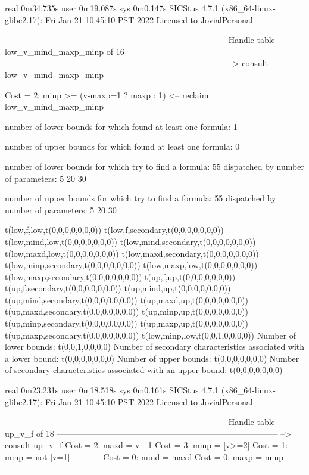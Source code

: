 real	0m34.735s
user	0m19.087s
sys	0m0.147s
SICStus 4.7.1 (x86_64-linux-glibc2.17): Fri Jan 21 10:45:10 PST 2022
Licensed to JovialPersonal


--------------------------------------------------------------------------------
Handle table low_v_mind_maxp_minp of 16
--------------------------------------------------------------------------------
--> consult low_v_mind_maxp_minp

Cost =  2:  minp >= (v-maxp=1 ? maxp : 1)
<-- reclaim low_v_mind_maxp_minp

number of lower bounds for which found at least one formula: 1

number of upper bounds for which found at least one formula: 0

number of lower bounds for which try to find a formula: 55
dispatched by number of parameters: 5  20  30

number of upper bounds for which try to find a formula: 55
dispatched by number of parameters: 5  20  30

t(low,f,low,t(0,0,0,0,0,0,0))
t(low,f,secondary,t(0,0,0,0,0,0,0))
t(low,mind,low,t(0,0,0,0,0,0,0))
t(low,mind,secondary,t(0,0,0,0,0,0,0))
t(low,maxd,low,t(0,0,0,0,0,0,0))
t(low,maxd,secondary,t(0,0,0,0,0,0,0))
t(low,minp,secondary,t(0,0,0,0,0,0,0))
t(low,maxp,low,t(0,0,0,0,0,0,0))
t(low,maxp,secondary,t(0,0,0,0,0,0,0))
t(up,f,up,t(0,0,0,0,0,0,0))
t(up,f,secondary,t(0,0,0,0,0,0,0))
t(up,mind,up,t(0,0,0,0,0,0,0))
t(up,mind,secondary,t(0,0,0,0,0,0,0))
t(up,maxd,up,t(0,0,0,0,0,0,0))
t(up,maxd,secondary,t(0,0,0,0,0,0,0))
t(up,minp,up,t(0,0,0,0,0,0,0))
t(up,minp,secondary,t(0,0,0,0,0,0,0))
t(up,maxp,up,t(0,0,0,0,0,0,0))
t(up,maxp,secondary,t(0,0,0,0,0,0,0))
t(low,minp,low,t(0,0,1,0,0,0,0))
Number of lower bounds:                                             t(0,0,1,0,0,0,0)
Number of secondary characteristics associated with a lower bound:  t(0,0,0,0,0,0,0)
Number of upper bounds:                                             t(0,0,0,0,0,0,0)
Number of secondary characteristics associated with an upper bound: t(0,0,0,0,0,0,0)

real	0m23.231s
user	0m18.518s
sys	0m0.161s
SICStus 4.7.1 (x86_64-linux-glibc2.17): Fri Jan 21 10:45:10 PST 2022
Licensed to JovialPersonal


--------------------------------------------------------------------------------
Handle table up_v_f of 18
--------------------------------------------------------------------------------
--> consult up_v_f
Cost =  2:  maxd = v - 1
Cost =  3:  minp = [v>=2]
Cost =  1:  minp = not [v=1]
----------
Cost =  0:  mind = maxd
Cost =  0:  maxp = minp
----------


